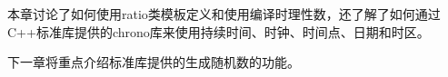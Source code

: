 本章讨论了如何使用ratio类模板定义和使用编译时理性数，还了解了如何通过C++标准库提供的chrono库来使用持续时间、时钟、时间点、日期和时区。

下一章将重点介绍标准库提供的生成随机数的功能。
